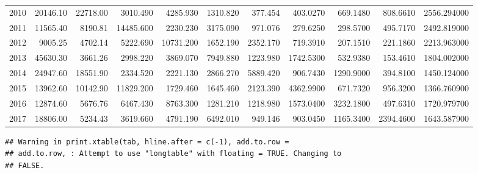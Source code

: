 \documentclass[]{article}
\begin{document}
\begin{table}[ht]
\begin{tabular}{rrrrrrrrrrr}
  2010 & 20146.10 & 22718.00 & 3010.490 & 4285.930 & 1310.820 & 377.454 & 403.0270 & 669.1480 & 808.6610 & 2556.294000 \\ 
  2011 & 11565.40 & 8190.81 & 14485.600 & 2230.230 & 3175.090 & 971.076 & 279.6250 & 298.5700 & 495.7170 & 2492.819000 \\ 
  2012 & 9005.25 & 4702.14 & 5222.690 & 10731.200 & 1652.190 & 2352.170 & 719.3910 & 207.1510 & 221.1860 & 2213.963000 \\ 
  2013 & 45630.30 & 3661.26 & 2998.220 & 3869.070 & 7949.880 & 1223.980 & 1742.5300 & 532.9380 & 153.4610 & 1804.002000 \\ 
  2014 & 24947.60 & 18551.90 & 2334.520 & 2221.130 & 2866.270 & 5889.420 & 906.7430 & 1290.9000 & 394.8100 & 1450.124000 \\ 
  2015 & 13962.60 & 10142.90 & 11829.200 & 1729.460 & 1645.460 & 2123.390 & 4362.9900 & 671.7320 & 956.3200 & 1366.760900 \\ 
  2016 & 12874.60 & 5676.76 & 6467.430 & 8763.300 & 1281.210 & 1218.980 & 1573.0400 & 3232.1800 & 497.6310 & 1720.979700 \\ 
  2017 & 18806.00 & 5234.43 & 3619.660 & 4791.190 & 6492.010 & 949.146 & 903.0450 & 1165.3400 & 2394.4600 & 1643.587900 \\ 
   \hline
\end{tabular}
\end{table}

\begin{verbatim}
## Warning in print.xtable(tab, hline.after = c(-1), add.to.row =
## add.to.row, : Attempt to use "longtable" with floating = TRUE. Changing to
## FALSE.
\end{verbatim}
\end{document}
